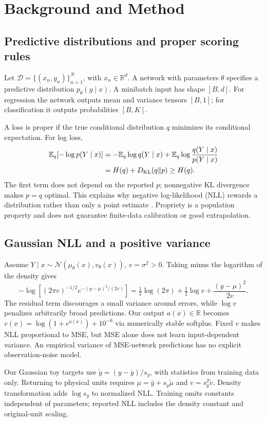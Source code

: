 \documentclass[11pt,a4paper]{article}
\newcommand{\R}{\mathbb{R}}
\newcommand{\E}{\mathbb{E}}
\begin{document}
\section{Background and Method}
\label{sec:method}
\subsection{Predictive distributions and proper scoring rules}
Let $\mathcal D=\{(x_n,y_n)\}_{n=1}^N$, with $x_n\in\R^d$. A network with parameters $\theta$ specifies a predictive distribution $p_\theta(y\mid x)$. A minibatch input has shape $[B,d]$. For regression the network outputs mean and variance tensors $[B,1]$; for classification it outputs probabilities $[B,K]$.

A loss is proper if the true conditional distribution $q$ minimizes its conditional expectation. For log loss,
\begin{align}
\E_q[-\log p(Y\mid x)]
&=-\E_q\log q(Y\mid x)+\E_q\log\frac{q(Y\mid x)}{p(Y\mid x)}\\
&=H(q)+D_{\rm KL}(q\Vert p)\geq H(q).\label{eq:proper}
\end{align}
The first term does not depend on the reported $p$; nonnegative KL divergence makes $p=q$ optimal. This explains why negative log-likelihood (NLL) rewards a distribution rather than only a point estimate \citep{gneiting2007proper}. Propriety is a population property and does not guarantee finite-data calibration or good extrapolation.

\subsection{Gaussian NLL and a positive variance}
Assume $Y\mid x\sim\mathcal N(\mu_\theta(x),v_\theta(x))$, $v=\sigma^2>0$. Taking minus the logarithm of the density gives
\begin{equation}
-\log\left[(2\pi v)^{-1/2}e^{-(y-\mu)^2/(2v)}\right]
=\tfrac12\log(2\pi)+\tfrac12\log v+\frac{(y-\mu)^2}{2v}.\label{eq:gaussian}
\end{equation}
The residual term discourages a small variance around errors, while $\log v$ penalizes arbitrarily broad predictions. Our output $a(x)\in\R$ becomes $v(x)=\log(1+e^{a(x)})+10^{-6}$ via numerically stable softplus. Fixed $v$ makes NLL proportional to MSE, but MSE alone does not learn input-dependent variance. An empirical variance of MSE-network predictions has no explicit observation-noise model.

Our Gaussian toy targets use $\widetilde y=(y-\bar y)/s_y$, with statistics from training data only. Returning to physical units requires $\mu=\bar y+s_y\widetilde\mu$ and $v=s_y^2\widetilde v$. Density transformation adds $\log s_y$ to normalized NLL. Training omits constants independent of parameters; reported NLL includes the density constant and original-unit scaling.
\end{document}
